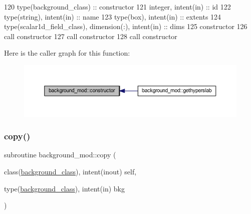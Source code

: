 \begin{DoxyCode}
120     \textcolor{keywordtype}{type}(background\_class) :: constructor
121     \textcolor{keywordtype}{integer}, \textcolor{keywordtype}{intent(in)} :: id
122     \textcolor{keywordtype}{type}(string), \textcolor{keywordtype}{intent(in)} :: name
123     \textcolor{keywordtype}{type}(box), \textcolor{keywordtype}{intent(in)} :: extents
124     \textcolor{keywordtype}{type}(scalar1d\_field\_class), \textcolor{keywordtype}{dimension(:)}, \textcolor{keywordtype}{intent(in)} :: dims
125     constructor%
126     \textcolor{keyword}{call }constructor%
127     \textcolor{keyword}{call }constructor%
128     \textcolor{keyword}{call }constructor%
\end{DoxyCode}
Here is the caller graph for this function\+:\nopagebreak
\begin{figure}[H]
\begin{center}
\leavevmode
\includegraphics[width=350pt]{namespacebackground__mod_ad0096fb6a5a11854fd70a7ce58dc3000_icgraph}
\end{center}
\end{figure}
\mbox{\label{namespacebackground__mod_ac6241a19bbe0f4b2482f95ed3d84056d}} 
\subsubsection{\texorpdfstring{copy()}{copy()}}
{\footnotesize\ttfamily subroutine background\+\_\+mod\+::copy (\begin{DoxyParamCaption}\item[{class(\mbox{\hyperlink{structbackground__mod_1_1background__class}{background\+\_\+class}}), intent(inout)}]{self,  }\item[{type(\mbox{\hyperlink{structbackground__mod_1_1background__class}{background\+\_\+class}}), intent(in)}]{bkg }\end{DoxyParamCaption})\hspace{0.3cm}{\ttfamily [private]}}



